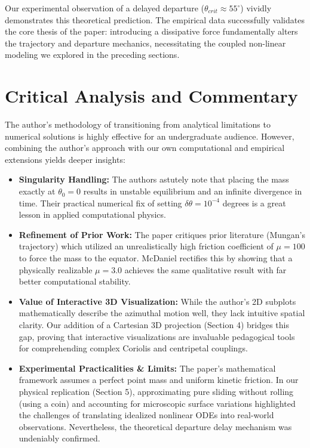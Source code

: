 \documentclass[11pt,letterpaper]{article}
\begin{document}
Our experimental observation of a delayed departure ($\theta_{crit} \approx 55^\circ$) vividly demonstrates this theoretical prediction. The empirical data successfully validates the core thesis of the paper: introducing a dissipative force fundamentally alters the trajectory and departure mechanics, necessitating the coupled non-linear modeling we explored in the preceding sections.

\section{Critical Analysis and Commentary}

The author's methodology of transitioning from analytical limitations to numerical solutions is highly effective for an undergraduate audience. However, combining the author's approach with our own computational and empirical extensions yields deeper insights:

\begin{itemize}
    \item \textbf{Singularity Handling:} The authors astutely note that placing the mass exactly at $\theta_0 = 0$ results in unstable equilibrium and an infinite divergence in time. Their practical numerical fix of setting $\delta\theta = 10^{-4}$ degrees is a great lesson in applied computational physics.
    \item \textbf{Refinement of Prior Work:} The paper critiques prior literature (Mungan's trajectory) which utilized an unrealistically high friction coefficient of $\mu = 100$ to force the mass to the equator. McDaniel rectifies this by showing that a physically realizable $\mu = 3.0$ achieves the same qualitative result with far better computational stability.
    \item \textbf{Value of Interactive 3D Visualization:} While the author's 2D subplots mathematically describe the azimuthal motion well, they lack intuitive spatial clarity. Our addition of a Cartesian 3D projection (Section 4) bridges this gap, proving that interactive visualizations are invaluable pedagogical tools for comprehending complex Coriolis and centripetal couplings.
    \item \textbf{Experimental Practicalities \& Limits:} The paper's mathematical framework assumes a perfect point mass and uniform kinetic friction. In our physical replication (Section 5), approximating pure sliding without rolling (using a coin) and accounting for microscopic surface variations highlighted the challenges of translating idealized nonlinear ODEs into real-world observations. Nevertheless, the theoretical departure delay mechanism was undeniably confirmed.
\end{itemize}
\end{document}
